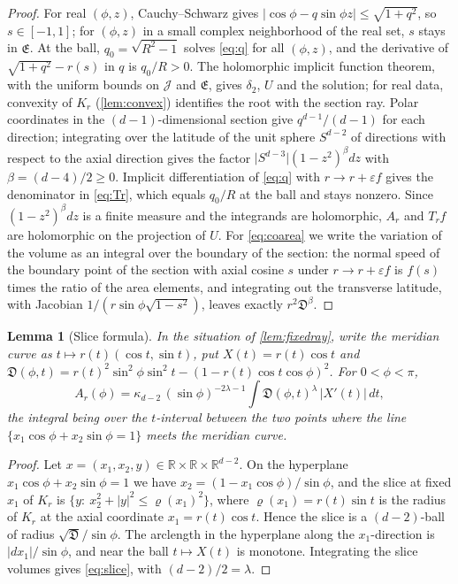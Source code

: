 \documentclass[11pt]{amsart}
\numberwithin{equation}{section}
\newtheorem{lemma}[theorem]{Lemma}
\theoremstyle{definition}
\theoremstyle{remark}
\newcommand{\R}{\mathbb{R}}
\newcommand{\eps}{\varepsilon}
\newcommand{\abs}[1]{\lvert #1\rvert}
\newcommand{\Disc}{\mathfrak D}
\begin{document}
\begin{proof}
For real $(\phi,z)$, Cauchy--Schwarz gives $\abs{\cos\phi-q\sin\phi z}\le\sqrt{1+q^2}$, so $s\in[-1,1]$; for $(\phi,z)$ in a small complex neighborhood of the real set, $s$ stays in $\mathfrak E$. At the ball, $q_0=\sqrt{R^2-1}$ solves \eqref{eq:q} for all $(\phi,z)$, and the derivative of $\sqrt{1+q^2}-r(s)$ in $q$ is $q_0/R>0$. The holomorphic implicit function theorem, with the uniform bounds on $\mathcal J$ and $\mathfrak E$, gives $\delta_2$, $U$ and the solution; for real data, convexity of $K_r$ (\cref{lem:convex}) identifies the root with the section ray. Polar coordinates in the $(d-1)$-dimensional section give $q^{d-1}/(d-1)$ for each direction; integrating over the latitude of the unit sphere $S^{d-2}$ of directions with respect to the axial direction gives the factor $\abs{S^{d-3}}(1-z^2)^\beta dz$ with $\beta=(d-4)/2\ge0$. Implicit differentiation of \eqref{eq:q} with $r\to r+\eps f$ gives the denominator in \eqref{eq:Tr}, which equals $q_0/R$ at the ball and stays nonzero. Since $(1-z^2)^\beta dz$ is a finite measure and the integrands are holomorphic, $A_r$ and $T_rf$ are holomorphic on the projection of $U$. For \eqref{eq:coarea} we write the variation of the volume as an integral over the boundary of the section: the normal speed of the boundary point of the section with axial cosine $s$ under $r\to r+\eps f$ is $f(s)$ times the ratio of the area elements, and integrating out the transverse latitude, with Jacobian $1/(r\sin\phi\sqrt{1-s^2})$, leaves exactly $r^2\Disc^\beta$.
\end{proof}

\begin{lemma}[Slice formula]\label{lem:slice}
In the situation of \cref{lem:fixedray}, write the meridian curve as $t\mapsto r(t)(\cos t,\sin t)$, put $X(t)=r(t)\cos t$ and $\Disc(\phi,t)=r(t)^2\sin^2\phi\sin^2t-(1-r(t)\cos t\cos\phi)^2$. For $0<\phi<\pi$,
\begin{equation}\label{eq:slice}
A_r(\phi)=\kappa_{d-2}\,(\sin\phi)^{-2\lambda-1}\int\Disc(\phi,t)^{\lambda}\,\abs{X'(t)}\,dt,
\end{equation}
the integral being over the $t$-interval between the two points where the line $\{x_1\cos\phi+x_2\sin\phi=1\}$ meets the meridian curve.
\end{lemma}

\begin{proof}
Let $x=(x_1,x_2,y)\in\R\times\R\times\R^{d-2}$. On the hyperplane $x_1\cos\phi+x_2\sin\phi=1$ we have $x_2=(1-x_1\cos\phi)/\sin\phi$, and the slice at fixed $x_1$ of $K_r$ is $\{y:\ x_2^2+\abs y^2\le\varrho(x_1)^2\}$, where $\varrho(x_1)=r(t)\sin t$ is the radius of $K_r$ at the axial coordinate $x_1=r(t)\cos t$. Hence the slice is a $(d-2)$-ball of radius $\sqrt{\Disc}/\sin\phi$. The arclength in the hyperplane along the $x_1$-direction is $\abs{dx_1}/\sin\phi$, and near the ball $t\mapsto X(t)$ is monotone. Integrating the slice volumes gives \eqref{eq:slice}, with $(d-2)/2=\lambda$.
\end{proof}
\end{document}
